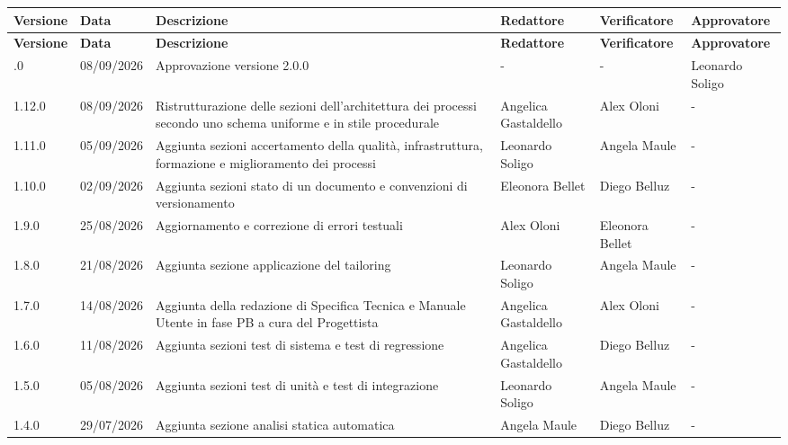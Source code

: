 \documentclass[a4paper,12pt]{article}
\begin{document}
\renewcommand{\arraystretch}{1.35}
{\footnotesize
    \setlength{\LTleft}{\fill}
    \setlength{\LTright}{\fill}
    \begin{longtable}{|p{1.1cm}|p{2.0cm}|p{4.3cm}|p{2.8cm}|p{2.0cm}|p{2.0cm}|}
        \hline
        \rowcolor{gray!20}
        \textbf{Versione} & \textbf{Data} & \textbf{Descrizione} & \textbf{Redattore} & \textbf{Verificatore} & \textbf{Approvatore} \\
        \hline
        \endfirsthead
        \hline
        \rowcolor{gray!20}
        \textbf{Versione} & \textbf{Data} & \textbf{Descrizione} & \textbf{Redattore} & \textbf{Verificatore} & \textbf{Approvatore} \\
        \hline
        \endhead
        \hline
        \endfoot
        \hline
        \endlastfoot
        2.0.0 & 08/09/2026 & Approvazione versione 2.0.0 & - & - & Leonardo Soligo \\
        \hline
        1.12.0 & 08/09/2026 & Ristrutturazione delle sezioni dell'architettura dei processi secondo uno schema uniforme e in stile procedurale & Angelica Gastaldello & Alex Oloni & - \\
        \hline
        1.11.0 & 05/09/2026 & Aggiunta sezioni accertamento della qualità, infrastruttura, formazione e miglioramento dei processi & Leonardo Soligo & Angela Maule & - \\
        \hline
        1.10.0 & 02/09/2026 & Aggiunta sezioni stato di un documento e convenzioni di versionamento & Eleonora Bellet & Diego Belluz & - \\
        \hline
        1.9.0 & 25/08/2026 & Aggiornamento e correzione di errori testuali & Alex Oloni & Eleonora Bellet & - \\
        \hline
        1.8.0 & 21/08/2026 & Aggiunta sezione applicazione del tailoring & Leonardo Soligo & Angela Maule & - \\
        \hline
        1.7.0 & 14/08/2026 & Aggiunta della redazione di Specifica Tecnica e Manuale Utente in fase PB a cura del Progettista & Angelica Gastaldello & Alex Oloni & - \\
        \hline
        1.6.0 & 11/08/2026 & Aggiunta sezioni test di sistema e test di regressione & Angelica Gastaldello & Diego Belluz & - \\
        \hline
        1.5.0 & 05/08/2026 & Aggiunta sezioni test di unità e test di integrazione & Leonardo Soligo & Angela Maule & - \\
        \hline
        1.4.0 & 29/07/2026 & Aggiunta sezione analisi statica automatica & Angela Maule & Diego Belluz & - \\

\end{longtable}}
\end{document}
